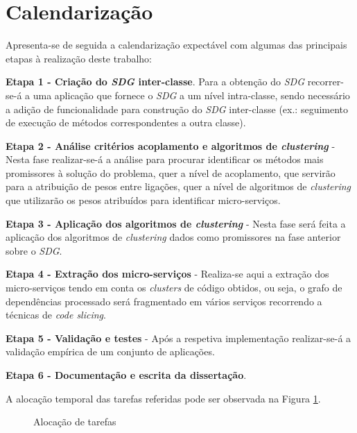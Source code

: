     
\section{Calendarização}

    Apresenta-se de seguida a calendarização expectável com algumas das principais etapas à realização deste trabalho:
    
    \textbf{Etapa 1 - Criação do \textit{SDG} inter-classe}. Para a obtenção do \textit{SDG} recorrer-se-á a uma aplicação que fornece o \textit{SDG} a um nível intra-classe, sendo necessário a adição de funcionalidade para construção do \textit{SDG} inter-classe (ex.: seguimento de execução de métodos correspondentes a outra classe).
    
    \textbf{Etapa 2 - Análise critérios acoplamento e algoritmos de \textit{clustering}} - Nesta fase realizar-se-á a análise para procurar identificar os métodos mais promissores à solução do problema, quer a nível de acoplamento, que servirão para a atribuição de pesos entre ligações, quer a nível de algoritmos de \textit{clustering} que utilizarão os pesos atribuídos para identificar micro-serviços.
    
     \textbf{Etapa 3 - Aplicação dos algoritmos de \textit{clustering}} - Nesta fase será feita a aplicação dos algoritmos de \textit{clustering} dados como promissores na fase anterior sobre o \textit{SDG}.
   
     \textbf{Etapa 4 - Extração dos micro-serviços} - Realiza-se aqui a extração dos micro-serviços tendo em conta os \textit{clusters} de código obtidos, ou seja, o grafo de dependências processado será fragmentado em vários serviços recorrendo a técnicas de \textit{code slicing}.
     
     \textbf{Etapa 5 - Validação e testes} - Após a respetiva implementação realizar-se-á a validação empírica de um conjunto de aplicações.
     
     
     
     \textbf{Etapa 6 - Documentação e escrita da dissertação}.
    
    
    A alocação temporal das tarefas referidas pode ser observada na Figura \ref{fig:gantt}.
    
     
\begin{figure}[htb]
\centering{
\resizebox{\textwidth}{!}{}}
\caption{Alocação de tarefas}\label{fig:gantt}
\end{figure}
    
  
